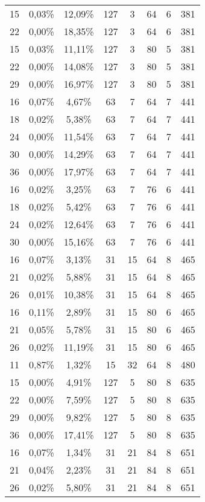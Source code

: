 \begin{multicols}{2}
\begin{center}
{\begin{tabular}{|c|c|c|c|c|c|c|c|}
15&0,03\%&12,09\%&127\hphantom{9}&\hphantom{9}3&64&6&381\\
22&0,00\%&18,35\%&127\hphantom{9}&\hphantom{9}3&64&6&381\\
\hline
15&0,03\%&11,11\%&127\hphantom{9}&\hphantom{9}3&80&5&381\\
22&0,00\%&14,08\%&127\hphantom{9}&\hphantom{9}3&80&5&381\\
29&0,00\%&16,97\%&127\hphantom{9}&\hphantom{9}3&80&5&381\\
\hline
16&0,07\%&\hphantom{9}4,67\%&63&\hphantom{9}7&64&7&441\\
18&0,02\%&\hphantom{9}5,38\%&63&\hphantom{9}7&64&7&441\\
24&0,00\%&11,54\%&63&\hphantom{9}7&64&7&441\\
30&0,00\%&14,29\%&63&\hphantom{9}7&64&7&441\\
36&0,00\%&17,97\%&63&\hphantom{9}7&64&7&441\\
\hline
16&0,02\%&\hphantom{9}3,25\%&63&\hphantom{9}7&76&6&441\\
18&0,02\%&\hphantom{9}5,42\%&63&\hphantom{9}7&76&6&441\\
24&0,02\%&12,64\%&63&\hphantom{9}7&76&6&441\\
30&0,00\%&15,16\%&63&\hphantom{9}7&76&6&441\\
\hline
16&0,07\%&\hphantom{9}3,13\%&31&15&64&8&465\\
21&0,02\%&\hphantom{9}5,88\%&31&15&64&8&465\\
26&0,01\%&10,38\%&31&15&64&8&465\\
\hline
16&0,11\%&\hphantom{9}2,89\%&31&15&80&6&465\\
21&0,05\%&\hphantom{9}5,78\%&31&15&80&6&465\\
26&0,02\%&11,19\%&31&15&80&6&465\\
\hline
11&0,87\%&\hphantom{9}1,32\%&15&32&64&8&480\\
\hline
15&0,00\%&\hphantom{9}4,91\%&127\hphantom{9}&\hphantom{9}5&80&8&635\\
22&0,00\%&\hphantom{9}7,59\%&127\hphantom{9}&\hphantom{9}5&80&8&635\\
29&0,00\%&\hphantom{9}9,82\%&127\hphantom{9}&\hphantom{9}5&80&8&635\\
36&0,00\%&17,41\%&127\hphantom{9}&\hphantom{9}5&80&8&635\\
\hline
16&0,07\%&\hphantom{9}1,34\%&31&21&84&8&651\\
21&0,04\%&\hphantom{9}2,23\%&31&21&84&8&651\\
26&0,02\%&\hphantom{9}5,80\%&31&21&84&8&651\\

\end{tabular}}
\end{center}
\end{multicols}
